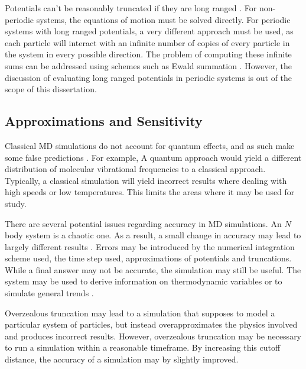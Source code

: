 %
Potentials can't be reasonably truncated if they are long ranged
\cite[p.~291]{frenkel2001understanding}.
%
For non-periodic systems, the equations of motion must be solved directly.
%
For periodic systems with long ranged potentials,
a very different approach must be used,
as each particle will interact with
an infinite number of copies of
every particle in the system in every possible direction.
%
The problem of computing these infinite sums can be addressed using
schemes such as Ewald summation
\cite{ewald1921berechnung}.
%
However, the discussion of evaluating long ranged potentials in periodic systems
is out of the scope of this dissertation.


\subsection{Approximations and Sensitivity}

Classical MD simulations do not account for quantum effects,
and as such make some false predictions
\cite[p.~390]{schlick2010molecular}.
%
For example, A quantum approach would yield
a different distribution of
molecular vibrational frequencies to a classical approach.
%
Typically, a classical simulation will yield incorrect results
where dealing with high speeds or low temperatures.
%
This limits the areas where it may be used for study.

There are several potential issues regarding accuracy in MD simulations.
%
An $N$ body system is a chaotic one.
%
As a result, a small change in accuracy may lead to
largely different results
\cite[p.~81]{frenkel2001understanding}.
%
Errors may be introduced by
the numerical integration scheme used,
the time step used,
approximations of potentials
and truncations.
%
While a final answer may not be accurate,
the simulation may still be useful.
%
The system may be used to derive information on
thermodynamic variables or to simulate general trends
\cite[p.~399]{schlick2010molecular}.

Overzealous truncation may lead to a simulation that supposes to
model a particular system of particles, but instead overapproximates
the physics involved and produces incorrect results.
%
However, overzealous truncation may be necessary to run a simulation
within a reasonable timeframe.
%
By increasing this cutoff distance, the accuracy of a simulation may
by slightly improved.
